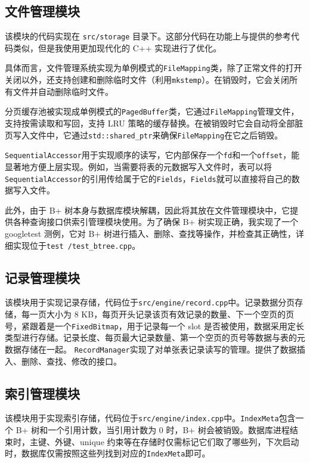 \documentclass{ctexart}
\begin{document}
\subsection{文件管理模块}
该模块的代码实现在 \texttt{src/storage} 目录下。这部分代码在功能上与提供的参考代码类似，但是我使用更加现代化的 C++ 实现进行了优化。

具体而言，文件管理系统实现为单例模式的\texttt{FileMapping}类，除了正常文件的打开关闭以外，还支持创建和删除临时文件（利用\texttt{mkstemp}）。在销毁时，它会关闭所有文件并自动删除临时文件。

分页缓存池被实现成单例模式的\texttt{PagedBuffer}类，它通过\texttt{FileMapping}管理文件，支持按需读取和写回，支持 LRU 策略的缓存替换。在被销毁时它会自动将全部脏页写入文件中，它通过\texttt{std::shared\_ptr}来确保\texttt{FileMapping}在它之后销毁。

\texttt{SequentialAccessor}用于实现顺序的读写，它内部保存一个\texttt{fd}和一个\texttt{offset}，能显著地方便上层实现。例如，当需要将表的元数据写入文件时，表可以将\texttt{SequentialAccessor}的引用传给属于它的\texttt{Fields}，\texttt{Fields}就可以直接将自己的数据写入文件。

此外，由于 B+ 树本身与数据库模块解耦，因此将其放在文件管理模块中，它提供各种查询接口供索引管理模块使用。为了确保 B+ 树实现正确，我实现了一个 googletest 测例，它对 B+ 树进行插入、删除、查找等操作，并检查其正确性，详细实现位于\texttt{test
	/test\_btree.cpp}。

\subsection{记录管理模块}
该模块用于实现记录存储，代码位于\texttt{src/engine/record.cpp}中。记录数据分页存储，每一页大小为 8 KB，每页开头记录该页有效记录的数量、下一个空页的页号，紧跟着是一个\texttt{FixedBitmap}，用于记录每一个 slot 是否被使用，数据采用定长类型进行存储。记录长度、每页最大记录数量、第一个空页的页号等数据与表的元数据存储在一起。
\texttt{RecordManager}实现了对单张表记录读写的管理。提供了数据插入、删除、查找、修改的接口。

\subsection{索引管理模块}
该模块用于实现索引存储，代码位于\texttt{src/engine/index.cpp}中。\texttt{IndexMeta}包含一个 B+ 树和一个引用计数，当引用计数为 0 时，B+ 树会被销毁。数据库进程结束时，主键、外键、unique 约束等在存储时仅需标记它们取了哪些列，下次启动时，数据库仅需按照这些列找到对应的\texttt{IndexMeta}即可。
\end{document}
